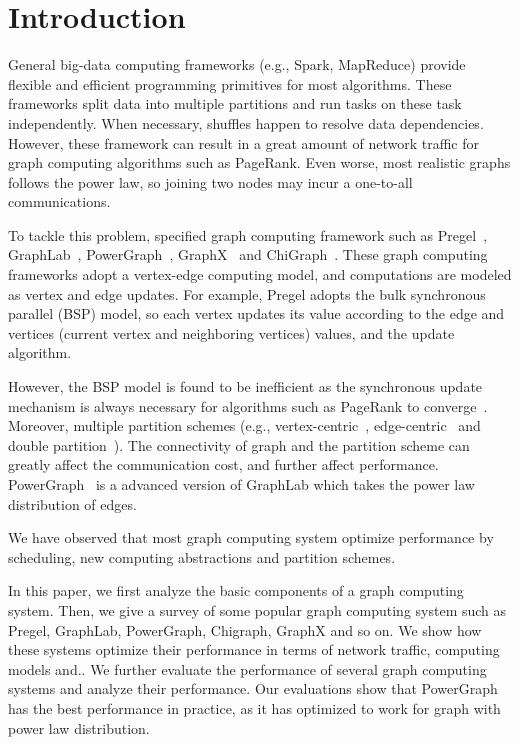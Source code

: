 \documentclass{acm_proc_article}
\newcommand{\eg}[0]{e.g.,}
\begin{document}
\section{Introduction}
General big-data computing frameworks (\eg{} Spark, MapReduce) provide
flexible and efficient programming primitives for most algorithms.
These frameworks split data into multiple partitions and run tasks on
these task independently. When necessary, shuffles happen to resolve data
dependencies.
However, these framework can result in a great amount of network traffic
for graph computing algorithms such as PageRank. Even worse, most realistic graphs
follows the power law, so joining two nodes may incur a one-to-all communications.

To tackle this problem, specified graph computing framework such as
Pregel~\cite{sigmod10:pregel},
GraphLab~\cite{graphlab}, PowerGraph~\cite{powergraph}, GraphX~\cite{graphx}
and ChiGraph~\cite{chigraph}. These graph computing frameworks
adopt a vertex-edge computing model, and computations are modeled
as vertex and edge updates. For example, Pregel adopts the bulk
synchronous parallel (BSP) model, so each vertex updates its value according
to the edge and vertices (current vertex and neighboring vertices) values, and
the update algorithm.

However, the BSP model is found to be inefficient as the synchronous update
mechanism is always necessary for algorithms such as PageRank to
converge~\cite{graphlab}. Moreover, multiple partition schemes (\eg{} vertex-centric~\cite{sigmod10:pregel},
edge-centric~\cite{edge} and double partition~\cite{osdi16}). The connectivity
of graph and the partition scheme can greatly affect the communication cost, and
further affect performance. PowerGraph~\cite{powergraph} is a advanced version of
GraphLab which takes the power law distribution of edges.

We have observed that most graph computing system optimize performance by
scheduling, new computing abstractions and partition schemes.

In this paper, we first analyze the basic components of a graph computing
system. Then, we give a survey of some popular graph computing system
such as Pregel, GraphLab, PowerGraph, Chigraph, GraphX and so on. We show
how these systems optimize their performance in terms of network traffic,
computing models and..
We further evaluate the performance of several graph computing systems
and analyze their performance.
Our evaluations show that PowerGraph has the best performance in practice,
as it has optimized to work for graph with power law distribution.
\end{document}
